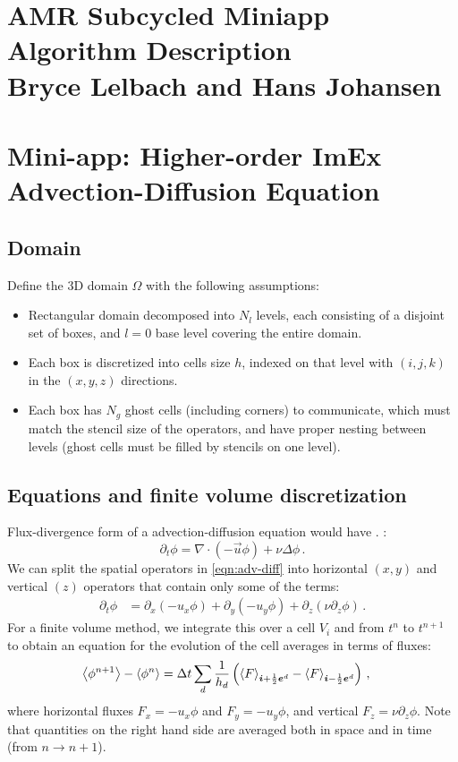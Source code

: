 \documentclass[11pt]{article}
\begin{document}
\section*{AMR Subcycled Miniapp Algorithm Description \\
          Bryce Lelbach and Hans Johansen}

\section{Mini-app: Higher-order ImEx Advection-Diffusion Equation}

\subsection{Domain}
Define the 3D domain $\Omega$ with the following assumptions:
\begin{itemize}
  \item Rectangular domain decomposed into $N_l$ levels, each
    consisting of a disjoint set of boxes, and $l = 0$ base level covering
    the entire domain.
  \item Each box is discretized into cells size $h$, indexed
    on that level with $(i,j,k)$ in the $(x,y,z)$ directions.
  \item Each box has $N_g$ ghost cells (including corners) to communicate, 
    which must match the stencil size of the operators, and have proper
    nesting between levels 
    (ghost cells must be filled by stencils on one level).
\end{itemize}

\subsection{Equations and finite volume discretization}
Flux-divergence form of a advection-diffusion equation would
  have . :
\begin{equation}
\label{eqn:adv-diff}
  \partial_t \phi = \nabla \cdot \left( - \vec{u} \phi \right) 
    + \nu \Delta \phi \, .
\end{equation}
We can split the spatial operators in \eqref{eqn:adv-diff} into 
  horizontal $(x,y)$ and vertical $(z)$ operators that contain
  only some of the terms:
\begin{align}
\label{eqn:advxy-diffz}
  \partial_t \phi 
    & = \partial_x \left( - u_x \phi \right) 
      + \partial_y \left( - u_y \phi \right) 
      + \partial_z \left( \nu \partial_z \phi \right)  \, .
\end{align}
For a finite volume method, we integrate this over a cell $V_i$ and
  from $t^n$ to $t^{n+1}$ to obtain an
  equation for the evolution of the cell averages in terms of fluxes:
\begin{align}
   \left\langle \phi^{n+1} \right\rangle - \left\langle \phi^n \right\rangle 
    & = {\Delta t} \sum_d \frac{1}{h_d} 
    \left( \left\langle F \right\rangle_{{\boldsymbol{i}}+\frac{1}{2}{\boldsymbol{e}}^d} - \left\langle F \right\rangle_{{\boldsymbol{i}}-\frac{1}{2}{\boldsymbol{e}}^d} \right) \, ,
\end{align}
  where horizontal fluxes $F_x = - u_x \phi$ and $F_y = - u_y \phi$, and 
  vertical $F_z = \nu \partial_{z} \phi$.
Note that quantities on the right hand side are averaged
  both in space and in time (from ${n \rightarrow {n+1}}$).
\end{document}
